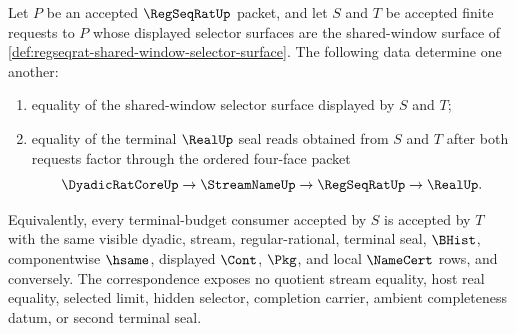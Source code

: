 \begin{theorem}
\label{thm:regseqrat-shared-window-terminal-pullback-equivalence}
Let $P$ be an accepted $\RegSeqRatUp$ packet, and let $S$ and $T$ be accepted finite requests to $P$ whose displayed selector surfaces are the shared-window surface of \autoref{def:regseqrat-shared-window-selector-surface}. The following data determine one another:
\begin{enumerate}
\item equality of the shared-window selector surface displayed by $S$ and $T$;
\item equality of the terminal $\RealUp$ seal reads obtained from $S$ and $T$ after both requests factor through the ordered four-face packet
$$
\DyadicRatCoreUp \to \StreamNameUp \to \RegSeqRatUp \to \RealUp .
$$
\end{enumerate}
Equivalently, every terminal-budget consumer accepted by $S$ is accepted by $T$ with the same visible dyadic, stream, regular-rational, terminal seal, $\BHist$, componentwise $\hsame$, displayed $\Cont$, $\Pkg$, and local $\NameCert$ rows, and conversely. The correspondence exposes no quotient stream equality, host real equality, selected limit, hidden selector, completion carrier, ambient completeness datum, or second terminal seal.
\end{theorem}
